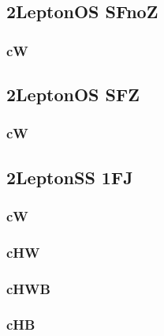 \documentclass[landscape, 12pt,letterpaper]{article}
\begin{document}
\subsection{2LeptonOS SFnoZ}
\subsubsection{cW}


\newpage

\newpage

\subsection{2LeptonOS SFZ}
\subsubsection{cW}


\newpage

\newpage

\subsection{2LeptonSS 1FJ}
\subsubsection{cW}


\newpage

\subsubsection{cHW}


\newpage

\subsubsection{cHWB}


\newpage

\subsubsection{cHB}


\newpage
\end{document}
